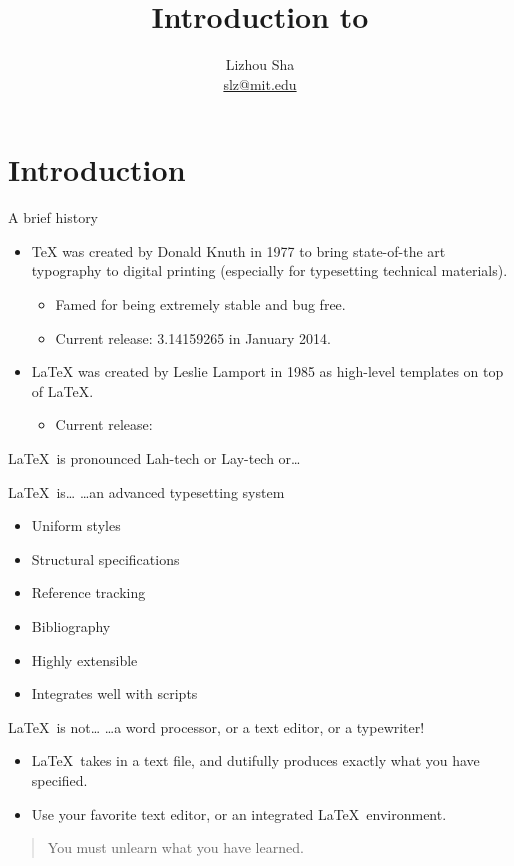 \documentclass{beamer}
\title{Introduction to \pLaTeX}
\author{Lizhou Sha\\\href{mailto:slz@mit.edu}{slz@mit.edu}}
\newcommand{\pLaTeX}{{\rmfamily\LaTeX}}
\newcommand{\pLaTeXe}{{\rmfamily\LaTeXe}}
\begin{document}
\frame{\titlepage}


\section{Introduction}

\begin{frame}{A brief history}
\begin{itemize}
    \item \alert{\rmfamily\TeX} was created by Donald Knuth in 1977 to bring state-of-the art typography to digital printing (especially for typesetting technical materials).
        \begin{itemize}
            \item Famed for being extremely stable and bug free.
            \item Current release: 3.14159265 in January 2014.
        \end{itemize}
    \item \alert{\pLaTeX} was created by Leslie Lamport in 1985 as high-level templates on top of \pLaTeX.
        \begin{itemize}
            \item Current release: \pLaTeXe
        \end{itemize}
\end{itemize}
\pLaTeX\ is pronounced Lah-tech or Lay-tech or\ldots
\end{frame}

\begin{frame}{\pLaTeX\ is\ldots}
\ldots an advanced typesetting system
\begin{itemize}
    \item Uniform styles
    \item Structural specifications
    \item Reference tracking
    \item Bibliography
    \item Highly extensible
    \item Integrates well with scripts
\end{itemize}
\end{frame}

\begin{frame}{\pLaTeX\ is not\ldots}
\ldots a word processor, or a text editor, or a typewriter!
\begin{itemize}
    \item \pLaTeX\ takes in a text file, and dutifully produces exactly what you have specified.
    \item Use your favorite text editor, or an integrated \pLaTeX\ environment.
\end{itemize}
\begin{quotation}
You must unlearn what you have learned.
\end{quotation}
\end{frame}
\end{document}
